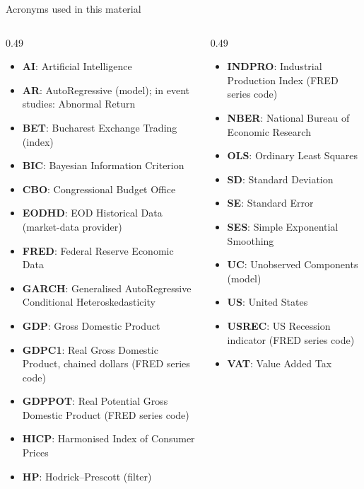{
\begin{frame}[noframenumbering]
    \titlepage
\end{frame}
}
\begin{frame}{Acronyms used in this material}
\begin{columns}[T]
\begin{column}{0.49\textwidth}
\begin{itemize}\setlength{\itemsep}{0pt}
    \item \textbf{AI}: Artificial Intelligence
    \item \textbf{AR}: AutoRegressive (model); in event studies: Abnormal Return
    \item \textbf{BET}: Bucharest Exchange Trading (index)
    \item \textbf{BIC}: Bayesian Information Criterion
    \item \textbf{CBO}: Congressional Budget Office
    \item \textbf{EODHD}: EOD Historical Data (market-data provider)
    \item \textbf{FRED}: Federal Reserve Economic Data
    \item \textbf{GARCH}: Generalised AutoRegressive Conditional Heteroskedasticity
    \item \textbf{GDP}: Gross Domestic Product
    \item \textbf{GDPC1}: Real Gross Domestic Product, chained dollars (FRED series code)
    \item \textbf{GDPPOT}: Real Potential Gross Domestic Product (FRED series code)
    \item \textbf{HICP}: Harmonised Index of Consumer Prices
    \item \textbf{HP}: Hodrick–Prescott (filter)
\end{itemize}
\end{column}
\begin{column}{0.49\textwidth}
\begin{itemize}\setlength{\itemsep}{0pt}
    \item \textbf{INDPRO}: Industrial Production Index (FRED series code)
    \item \textbf{NBER}: National Bureau of Economic Research
    \item \textbf{OLS}: Ordinary Least Squares
    \item \textbf{SD}: Standard Deviation
    \item \textbf{SE}: Standard Error
    \item \textbf{SES}: Simple Exponential Smoothing
    \item \textbf{UC}: Unobserved Components (model)
    \item \textbf{US}: United States
    \item \textbf{USREC}: US Recession indicator (FRED series code)
    \item \textbf{VAT}: Value Added Tax
\end{itemize}
\end{column}
\end{columns}
\end{frame}
